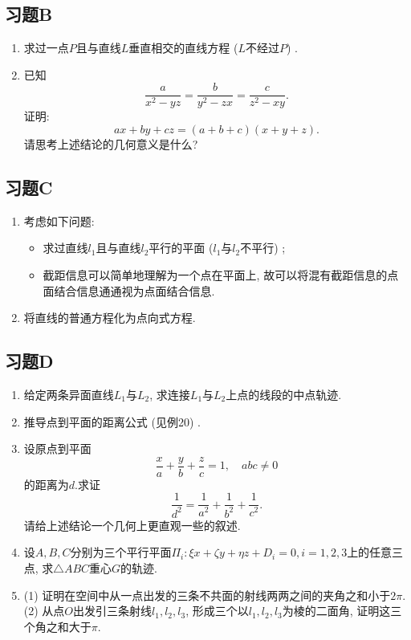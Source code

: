 \documentclass[./main.tex]{subfiles}
\begin{document}
\subsection*{习题B}
\begin{enumerate}
    \item 求过一点$P$且与直线$L$垂直相交的直线方程 ($L$不经过$P$) .
    \item 已知$$\frac{a}{x^2-yz}=\frac{b}{y^2-zx}=\frac{c}{z^2-xy}.$$证明: $$ax+by+cz=(a+b+c)(x+y+z).$$请思考上述结论的几何意义是什么? 
\end{enumerate}

\subsection*{习题C}
\begin{enumerate}
    \item 考虑如下问题: 
\begin{itemize}
    \item 求过直线$l_1$且与直线$l_2$平行的平面 ($l_1$与$l_2$不平行) ; 
    \item 截距信息可以简单地理解为一个点在平面上, 故可以将混有截距信息的点面结合信息通通视为点面结合信息.
\end{itemize} 
\item 将直线的普通方程化为点向式方程.
\end{enumerate}

\subsection*{习题D}
\begin{enumerate}
    \item 给定两条异面直线$L_1$与$L_2$, 求连接$L_1$与$L_2$上点的线段的中点轨迹.
    \item 推导点到平面的距离公式 (见例20) .
    \item 设原点到平面$$\frac{x}{a}+\frac{y}{b}+\frac{z}{c}=1,\quad abc\neq 0$$
的距离为$d$.求证$$\frac{1}{d^2}=\frac{1}{a^2}+\frac{1}{b^2}+\frac{1}{c^2}.$$请给上述结论一个几何上更直观一些的叙述.
\item 设$A,B,C$分别为三个平行平面$\Pi_i:\xi x+\zeta y+\eta z +D_i=0,i=1,2,3$上的任意三点, 求$\triangle ABC$重心$G$的轨迹.
\item  (1) 证明在空间中从一点出发的三条不共面的射线两两之间的夹角之和小于$2\pi$.\\ (2) 从点$O$出发引三条射线$l_1,l_2,l_3$, 形成三个以$l_1,l_2,l_3$为棱的二面角, 证明这三个角之和大于$\pi$.
\end{enumerate}
\end{document}
